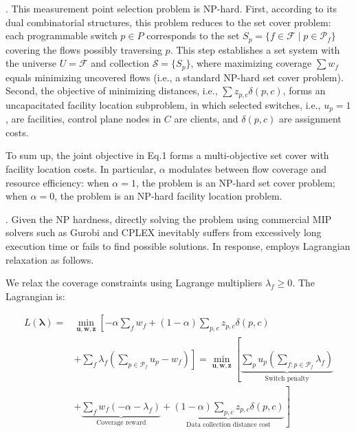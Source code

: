 . This measurement point selection problem is NP-hard. First, according to its dual combinatorial structures, this problem reduces to the set cover problem: each programmable switch $p \in P$ corresponds to the set $S_p = \{ f \in \mathcal{F} \mid p \in \mathcal{P}_f \}$ covering the flows possibly traversing $p$. This step establishes a set system with the universe $U = \mathcal{F}$ and collection $\mathcal{S} = \{ S_p \}$, where maximizing coverage $\sum w_f$ equals minimizing uncovered flows (i.e., a standard NP-hard set cover problem). Second, the objective of minimizing distances, i.e., $\sum z_{p,c} \delta(p,c)$, forms an uncapacitated facility location subproblem, in which selected switches, i.e., $u_p=1$, are facilities, control plane nodes in $C$ are clients, and $\delta(p,c)$ are assignment costs. 

To sum up, the joint objective in Eq.1 forms a multi-objective set cover with facility location costs. In particular, $\alpha$ modulates between flow coverage and resource efficiency: when $\alpha=1$, the problem is an NP-hard set cover problem; when $\alpha=0$, the problem is an NP-hard facility location problem.  

. Given the NP hardness, directly solving the problem using commercial MIP solvers such as Gurobi \cite{gurobi} and CPLEX \cite{cplex} inevitably suffers from excessively long execution time or fails to find possible solutions. In response, \sysname employs Lagrangian relaxation as follows.

We relax the coverage constraints using Lagrange multipliers \(\lambda_f \geq 0\). The Lagrangian is:

\vspace{-10pt}
{\footnotesize
\begin{align}
L(\boldsymbol{\lambda}) = &\min_{\mathbf{u},\mathbf{w},\mathbf{z}} \left[ 
-\alpha \sum_{f} w_f + (1-\alpha) \sum_{p,c} z_{p,c} \delta(p,c) \right. \nonumber \\ &\left. + \sum_{f} \lambda_f \left( \sum_{p \in \mathcal{P}_f} u_p - w_f \right)
\right] 
= \min_{\mathbf{u},\mathbf{w},\mathbf{z}} \left[ 
\underbrace{\sum_{p} u_p \left( \sum_{f: p \in \mathcal{P}_f} \lambda_f \right)}_{\text{Switch penalty}} \right. \nonumber \\ &+ \left.
\underbrace{\sum_{f} w_f (-\alpha - \lambda_f)}_{\text{Coverage reward}} +
\underbrace{(1-\alpha) \sum_{p,c} z_{p,c} \delta(p,c)}_{\text{Data collection distance cost}}
\right]
\end{align}}
\vspace{-7pt}


